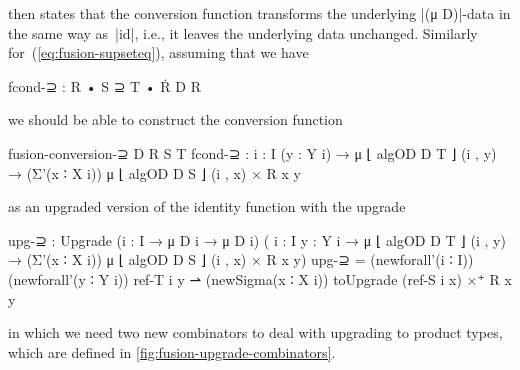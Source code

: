 then states that the conversion function transforms the underlying |(μ D)|-data in the same way as~|id|, i.e., it leaves the underlying data unchanged.
Similarly for~(\ref{eq:fusion-supseteq}), assuming that we have
\begin{code}
fcond-⊇ : R • S ⊇ T • Ṙ D R
\end{code}
we should be able to construct the conversion function
\begin{code}
fusion-conversion-⊇ D R S T fcond-⊇ :
  {i : I} (y : Y i) → μ ⌊ algOD D T ⌋ (i , y) →
  (Σ'(x ∶ X i)) μ ⌊ algOD D S ⌋ (i , x) × R x y
\end{code}
as an upgraded version of the identity function with the upgrade
\begin{code}
upg-⊇ : Upgrade  ({i : I} → μ D i → μ D i)
                 (  {i : I} {y : Y i} → μ ⌊ algOD D T ⌋ (i , y) →
                    (Σ'(x ∶ X i)) μ ⌊ algOD D S ⌋ (i , x) × R x y)
upg-⊇ =  (newforall'(i ∶ I)) (newforall'(y ∶ Y i)) ref-T i y ⇀
         (newSigma(x ∶ X i)) toUpgrade (ref-S i x) ×⁺ R x y
\end{code}
in which we need two new combinators to deal with upgrading to product types, which are defined in \autoref{fig:fusion-upgrade-combinators}.

